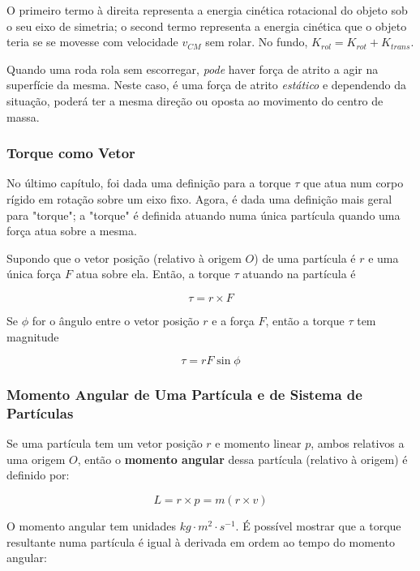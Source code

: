 O primeiro termo à direita representa a energia cinética rotacional do objeto sob o seu eixo de simetria; o second termo representa a energia cinética que o objeto teria se se movesse com velocidade $v_{CM}$ sem rolar. No fundo, $K_{rol}=K_{rot}+K_{trans}$.

Quando uma roda rola sem escorregar, \emph{pode} haver força de atrito a agir na superfície da mesma. Neste caso, é uma força de atrito \emph{estático} e dependendo da situação, poderá ter a mesma direção ou oposta ao movimento do centro de massa.

\subsubsection{Torque como Vetor}
No último capítulo, foi dada uma definição para a torque $\tau$ que atua num corpo rígido em rotação sobre um eixo fixo. Agora, é dada uma definição mais geral para "torque"; a "torque" é definida atuando numa única partícula quando uma força atua sobre a mesma.

Supondo que o vetor posição (relativo à origem $O$) de uma partícula é $r$ e uma única força $F$ atua sobre ela. Então, a torque $\tau$ atuando na partícula é

\begin{equation}
    \tau=r\times F
\end{equation}

Se $\phi$ for o ângulo entre o vetor posição $r$ e a força $F$, então a torque $\tau$ tem magnitude

\begin{equation*}
    \tau=rF\sin\phi
\end{equation*}

\subsubsection{Momento Angular de Uma Partícula e de Sistema de Partículas}
Se uma partícula tem um vetor posição $r$ e momento linear $p$, ambos relativos a uma origem $O$, então o \textbf{momento angular} dessa partícula (relativo à origem) é definido por:

\begin{equation}
    L=r\times p=m(r\times v)
\end{equation}

O momento angular tem unidades $kg\cdot m^2\cdot s^{-1}$.
É possível mostrar que a torque resultante numa partícula é igual à derivada em ordem ao tempo do momento angular:

